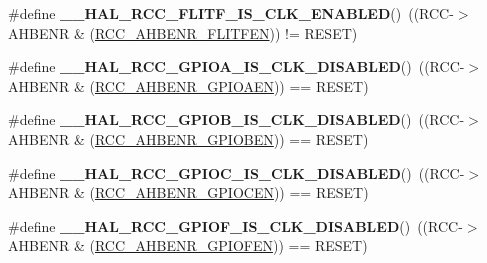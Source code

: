 \begin{DoxyCompactItemize}
\#define {\bfseries \+\_\+\+\_\+\+H\+A\+L\+\_\+\+R\+C\+C\+\_\+\+F\+L\+I\+T\+F\+\_\+\+I\+S\+\_\+\+C\+L\+K\+\_\+\+E\+N\+A\+B\+L\+ED}()~((R\+CC-\/$>$A\+H\+B\+E\+NR \& (\hyperlink{group___peripheral___registers___bits___definition_ga67a12de126652d191a1bc2c114c3395a}{R\+C\+C\+\_\+\+A\+H\+B\+E\+N\+R\+\_\+\+F\+L\+I\+T\+F\+EN})) != R\+E\+S\+ET)
\item 
\mbox{\label{group___r_c_c___a_h_b___peripheral___clock___enable___disable___status_ga2d73b007700fe1576c7965ce677148bd}} 
\#define {\bfseries \+\_\+\+\_\+\+H\+A\+L\+\_\+\+R\+C\+C\+\_\+\+G\+P\+I\+O\+A\+\_\+\+I\+S\+\_\+\+C\+L\+K\+\_\+\+D\+I\+S\+A\+B\+L\+ED}()~((R\+CC-\/$>$A\+H\+B\+E\+NR \& (\hyperlink{group___peripheral___registers___bits___definition_ga8909660b884f126ab1476daac7999619}{R\+C\+C\+\_\+\+A\+H\+B\+E\+N\+R\+\_\+\+G\+P\+I\+O\+A\+EN})) == R\+E\+S\+ET)
\item 
\mbox{\label{group___r_c_c___a_h_b___peripheral___clock___enable___disable___status_ga9b9353035473ac5f144f6e5385c4bebb}} 
\#define {\bfseries \+\_\+\+\_\+\+H\+A\+L\+\_\+\+R\+C\+C\+\_\+\+G\+P\+I\+O\+B\+\_\+\+I\+S\+\_\+\+C\+L\+K\+\_\+\+D\+I\+S\+A\+B\+L\+ED}()~((R\+CC-\/$>$A\+H\+B\+E\+NR \& (\hyperlink{group___peripheral___registers___bits___definition_gab7995351a5b0545e8cd86a228d97dcec}{R\+C\+C\+\_\+\+A\+H\+B\+E\+N\+R\+\_\+\+G\+P\+I\+O\+B\+EN})) == R\+E\+S\+ET)
\item 
\mbox{\label{group___r_c_c___a_h_b___peripheral___clock___enable___disable___status_ga5e939d98ecca025c028bd1d837b84c81}} 
\#define {\bfseries \+\_\+\+\_\+\+H\+A\+L\+\_\+\+R\+C\+C\+\_\+\+G\+P\+I\+O\+C\+\_\+\+I\+S\+\_\+\+C\+L\+K\+\_\+\+D\+I\+S\+A\+B\+L\+ED}()~((R\+CC-\/$>$A\+H\+B\+E\+NR \& (\hyperlink{group___peripheral___registers___bits___definition_ga7e5c4504b7adbb13372e7536123a756b}{R\+C\+C\+\_\+\+A\+H\+B\+E\+N\+R\+\_\+\+G\+P\+I\+O\+C\+EN})) == R\+E\+S\+ET)
\item 
\mbox{\label{group___r_c_c___a_h_b___peripheral___clock___enable___disable___status_ga843a7fcc2441b978cadacbea548dff93}} 
\#define {\bfseries \+\_\+\+\_\+\+H\+A\+L\+\_\+\+R\+C\+C\+\_\+\+G\+P\+I\+O\+F\+\_\+\+I\+S\+\_\+\+C\+L\+K\+\_\+\+D\+I\+S\+A\+B\+L\+ED}()~((R\+CC-\/$>$A\+H\+B\+E\+NR \& (\hyperlink{group___peripheral___registers___bits___definition_ga9c0de1cc7b72b07f81bce3597a63dc39}{R\+C\+C\+\_\+\+A\+H\+B\+E\+N\+R\+\_\+\+G\+P\+I\+O\+F\+EN})) == R\+E\+S\+ET)

\end{DoxyCompactItemize}
